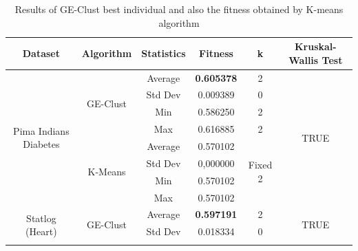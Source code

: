 \documentclass[journal]{IEEEtran}
\begin{document}
	\begin{table}[]
		\centering
		\caption{Results of GE-Clust best individual and also the fitness obtained by K-means algorithm}
		\label{results-ge-and-kmeans}
		\begin{tabular}{|c|c|c|c|c|c|}
			\hline
			\textbf{Dataset}           & \textbf{Algorithm} & \textbf{Statistics} & \textbf{Fitness} & \textbf{k}    & \textbf{Kruskal-Wallis Test}   \\ \hline
			\multirow{8}{*}{Pima Indians Diabetes} & \multirow{4}{*}{GE-Clust}           & Average                        & \textbf{0.605378}                    & 2                        & \multirow{8}{*}{TRUE} \\ \cline{3-5}
			&                               & Std Dev                        & 0.009389                    & 0                        &                       \\ \cline{3-5}
			&                               & Min                            & 0.586250                    & 2                        &                       \\ \cline{3-5}
			&                               & Max                            & 0.616885                   & 2                        &                       \\ \cline{2-5}
			& \multirow{4}{*}{K-Means}      & Average                        & 0.570102                   & \multirow{4}{*}{Fixed 2} &                       \\ \cline{3-4}
			&                               & Std Dev                        & 0,000000                   &                          &                       \\ \cline{3-4}
			&                               & Min                            & 0.570102                   &                          &                       \\ \cline{3-4}
			&                               & Max                            & 0.570102                   &                          &                       \\ \hline
			\multirow{8}{*}{Statlog (Heart)}       & \multirow{4}{*}{GE-Clust}           & Average                        & \textbf{0.597191}                    & 2                        & \multirow{8}{*}{TRUE} \\ \cline{3-5}
			&                               & Std Dev                        & 0.018334                    & 0                        &                       \\ \cline{3-5}

\end{tabular}
\end{table}
\end{document}
